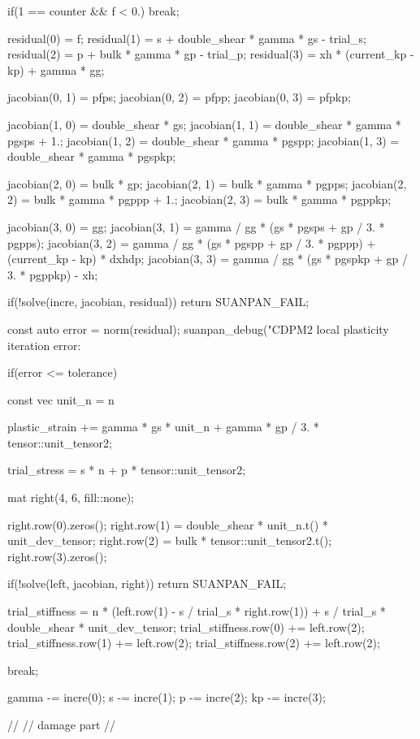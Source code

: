 \begin{cppcode}
{{		if(1 == counter && f < 0.) break;

		residual(0) = f;
		residual(1) = s + double_shear * gamma * gs - trial_s;
		residual(2) = p + bulk * gamma * gp - trial_p;
		residual(3) = xh * (current_kp - kp) + gamma * gg;

		jacobian(0, 1) = pfps;
		jacobian(0, 2) = pfpp;
		jacobian(0, 3) = pfpkp;

		jacobian(1, 0) = double_shear * gs;
		jacobian(1, 1) = double_shear * gamma * pgsps + 1.;
		jacobian(1, 2) = double_shear * gamma * pgspp;
		jacobian(1, 3) = double_shear * gamma * pgspkp;

		jacobian(2, 0) = bulk * gp;
		jacobian(2, 1) = bulk * gamma * pgpps;
		jacobian(2, 2) = bulk * gamma * pgppp + 1.;
		jacobian(2, 3) = bulk * gamma * pgppkp;

		jacobian(3, 0) = gg;
		jacobian(3, 1) = gamma / gg * (gs * pgsps + gp / 3. * pgpps);
		jacobian(3, 2) = gamma / gg * (gs * pgspp + gp / 3. * pgppp) + (current_kp - kp) * dxhdp;
		jacobian(3, 3) = gamma / gg * (gs * pgspkp + gp / 3. * pgppkp) - xh;

		if(!solve(incre, jacobian, residual)) return SUANPAN_FAIL;

		const auto error = norm(residual);
		suanpan_debug("CDPM2 local plasticity iteration error: %

		if(error <= tolerance) {
			const vec unit_n = n %

			plastic_strain += gamma * gs * unit_n + gamma * gp / 3. * tensor::unit_tensor2;

			trial_stress = s * n + p * tensor::unit_tensor2;

			mat right(4, 6, fill::none);

			right.row(0).zeros();
			right.row(1) = double_shear * unit_n.t() * unit_dev_tensor;
			right.row(2) = bulk * tensor::unit_tensor2.t();
			right.row(3).zeros();

			if(!solve(left, jacobian, right)) return SUANPAN_FAIL;

			trial_stiffness = n * (left.row(1) - s / trial_s * right.row(1)) + s / trial_s * double_shear * unit_dev_tensor;
			trial_stiffness.row(0) += left.row(2);
			trial_stiffness.row(1) += left.row(2);
			trial_stiffness.row(2) += left.row(2);

			break;
		}

		gamma -= incre(0);
		s -= incre(1);
		p -= incre(2);
		kp -= incre(3);
	}

	//
	// damage part
	//

}
\end{cppcode}
